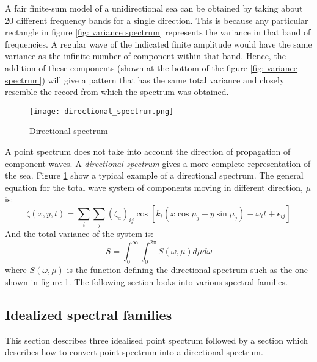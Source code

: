 A fair finite-sum model of a unidirectional sea can be obtained by taking about
20 different frequency bands for a single direction. This is because any
particular rectangle in figure \ref{fig: variance spectrum} represents the
variance in that band of frequencies. A regular wave of the indicated finite
amplitude would have the same variance as the infinite number of component
within that band. Hence, the addition of these components (shown at the bottom
of the figure \ref{fig: variance spectrum}) will give a pattern that has the
same total variance and closely resemble the record from which the spectrum was
obtained.

\begin{figure}
  \centering
  \texttt{[image: directional\_spectrum.png]}
  \caption{Directional spectrum}
  \label{fig: directional spectrum}
\end{figure}

A point spectrum does not take into account the direction of propagation of
component waves. A \textit{directional spectrum} gives a more complete
representation of the sea. Figure \ref{fig: directional spectrum} show a typical
example of a directional spectrum. The general equation for the total wave
system of components moving in different direction, $\mu$ is:
\begin{equation}
  \zeta(x,y,t) = \sum _i \sum _j (\zeta_a)_{ij} \cos[k_i (x \cos \mu_j + 
  y \sin \mu_j) - \omega_i t + \epsilon_{ij}]
  \label{eq: equation of ocean wave system}
\end{equation}
And the total variance of the system is:
\begin{equation}
  S = \int_{0}^{\infty} \int_{0}^{2\pi} S(\omega, \mu) d\mu d\omega
  \label{eq: total variance for ocean wave system}
\end{equation}
where $S(\omega, \mu)$ is the function defining the directional spectrum such as
the one shown in figure \ref{fig: directional spectrum}. The following section
looks into various spectral families.

\subsection{Idealized spectral families} \label{Idealized spectral families}

This section describes three idealised point spectrum followed by a section
which describes how to convert point spectrum into a directional spectrum.

